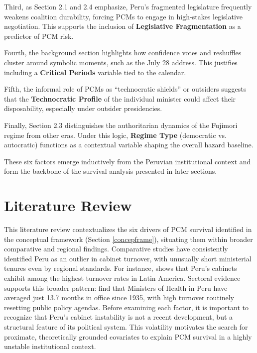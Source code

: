 \documentclass[a4paper, 12pt]{article}
\begin{document}
Third, as Section 2.1 and 2.4 emphasize, Peru’s fragmented legislature frequently weakens coalition durability, forcing PCMs to engage in high-stakes legislative negotiation. This supports the inclusion of \textbf{Legislative Fragmentation} as a predictor of PCM risk.

Fourth, the background section highlights how confidence votes and reshuffles cluster around symbolic moments, such as the July 28 address. This justifies including a \textbf{Critical Periods} variable tied to the calendar.

Fifth, the informal role of PCMs as ``technocratic shields'' or outsiders suggests that the \textbf{Technocratic Profile} of the individual minister could affect their disposability, especially under outsider presidencies.

Finally, Section 2.3 distinguishes the authoritarian dynamics of the Fujimori regime from other eras. Under this logic, \textbf{Regime Type} (democratic vs. autocratic) functions as a contextual variable shaping the overall hazard baseline.

These six factors emerge inductively from the Peruvian institutional context and form the backbone of the survival analysis presented in later sections.



\section{Literature Review}\label{sec:letrev}




This literature review contextualizes the six drivers of PCM survival identified in the conceptual framework (Section \ref{concepframe}), situating them within broader comparative and regional findings. Comparative studies have consistently identified Peru as an outlier in cabinet turnover, with unusually short ministerial tenures even by regional standards. For instance, \citet{martinez-gallardo_out_2012} shows that Peru’s cabinets exhibit among the highest turnover rates in Latin America. Sectoral evidence supports this broader pattern: \citet{gozzer_duracion_2021} find that Ministers of Health in Peru have averaged just 13.7 months in office since 1935, with high turnover routinely resetting public policy agendas. Before examining each factor, it is important to recognize that Peru’s cabinet instability is not a recent development, but a structural feature of its political system. This volatility motivates the search for proximate, theoretically grounded covariates to explain PCM survival in a highly unstable institutional context.
\end{document}
